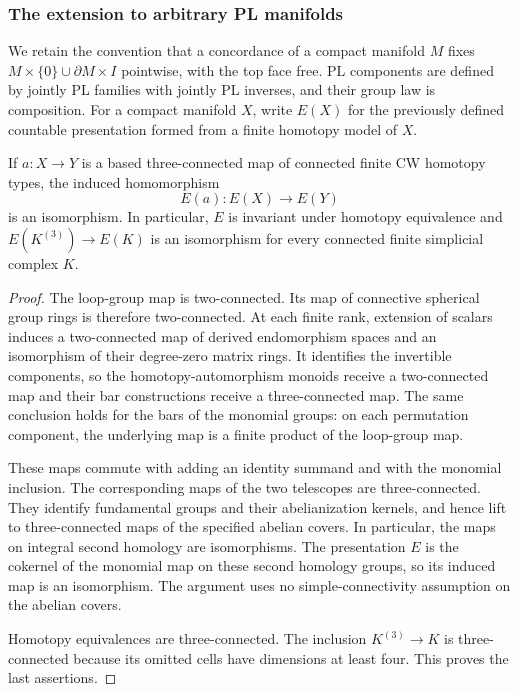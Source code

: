 \subsubsection{The extension to arbitrary PL manifolds}

We retain the convention that a concordance of a compact manifold $M$
fixes $M\times\{0\}\cup\partial M\times I$ pointwise, with the top face
free.  PL components are defined by jointly PL families with jointly PL
inverses, and their group law is composition.  For a compact manifold
$X$, write $E(X)$ for the previously defined countable presentation
formed from a finite homotopy model of $X$.

\begin{lemma}\label{lem:component-followup-E-naturality}
If $a:X\to Y$ is a based three-connected map of connected finite CW
homotopy types, the induced homomorphism
\[
                         E(a):E(X)\longrightarrow E(Y)
\]
is an isomorphism.  In particular, $E$ is invariant under homotopy
equivalence and $E(K^{(3)})\to E(K)$ is an isomorphism for every connected
finite simplicial complex $K$.
\end{lemma}

\begin{proof}
The loop-group map is two-connected.  Its map of connective spherical
group rings is therefore two-connected.  At each finite rank, extension
of scalars induces a two-connected map of derived endomorphism spaces
and an isomorphism of their degree-zero matrix rings.  It identifies
the invertible components, so the homotopy-automorphism monoids receive
a two-connected map and their bar constructions receive a
three-connected map.  The same conclusion holds for the bars of the
monomial groups: on each permutation component, the underlying map is
a finite product of the loop-group map.

These maps commute with adding an identity summand and with the
monomial inclusion.  The corresponding maps of the two telescopes are
three-connected.  They identify fundamental groups and their
abelianization kernels, and hence lift to three-connected maps of the
specified abelian covers.  In particular, the maps on integral second
homology are isomorphisms.  The presentation $E$ is the cokernel of the
monomial map on these second homology groups, so its induced map is an
isomorphism.  The argument uses no simple-connectivity assumption on
the abelian covers.

Homotopy equivalences are three-connected.  The inclusion
$K^{(3)}\to K$ is three-connected because its omitted cells have
dimensions at least four.  This proves the last assertions.
\end{proof}

